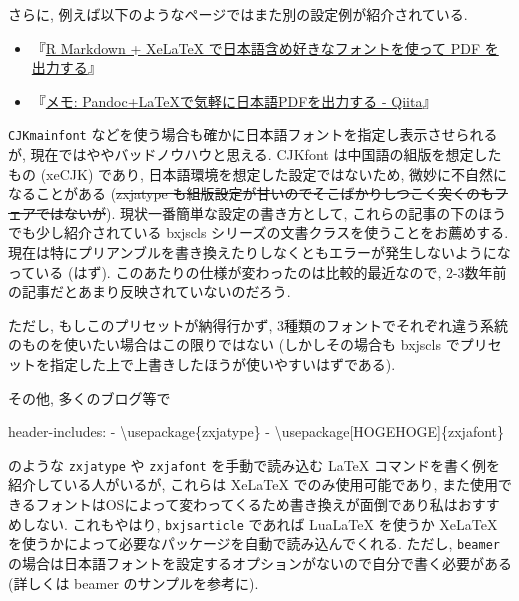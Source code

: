 \documentclass[
  letterpaper,
  DIV=11,
  pandoc,
  ja=standard,
  jafont=noto-otf]{bxjsarticle}
\newenvironment{Shaded}{\begin{snugshade}}{\end{snugshade}}
\newcommand{\AttributeTok}[1]{\textcolor[rgb]{0.00,0.48,0.65}{#1}}
\newcommand{\FunctionTok}[1]{\textcolor[rgb]{0.28,0.35,0.67}{#1}}
\newcommand{\KeywordTok}[1]{\textcolor[rgb]{0.00,0.48,0.65}{#1}}
\providecommand{\tightlist}{%
  \setlength{\itemsep}{0pt}\setlength{\parskip}{0pt}}
\begin{document}
さらに, 例えば以下のようなページではまた別の設定例が紹介されている.

\begin{itemize}
\tightlist
\item
  『\href{https://blog.atusy.net/2019/05/14/rmd2pdf-any-font/}{R
  Markdown + XeLaTeX で日本語含め好きなフォントを使って PDF
  を出力する}』
\item
  『\href{https://qiita.com/sky_y/items/15bf7737f4b37da50372\#\%E6\%96\%B9\%E6\%B3\%952-3-bxjscls\%E3\%81\%A7-cjkmainfont\%E5\%A4\%89\%E6\%95\%B0\%E3\%82\%92\%E4\%BD\%BF\%E3\%81\%86\%E6\%96\%B9\%E6\%B3\%95}{メモ:
  Pandoc+LaTeXで気軽に日本語PDFを出力する - Qiita}』
\end{itemize}

\texttt{CJKmainfont}
などを使う場合も確かに日本語フォントを指定し表示させられるが,
現在ではややバッドノウハウと思える. CJKfont は中国語の組版を想定したもの
(xeCJK) であり, 日本語環境を想定した設定ではないため,
微妙に不自然になることがある (\sout{zxjatype
も組版設定が甘いのでそこばかりしつこく突くのもフェアではないが}).
現状一番簡単な設定の書き方として,
これらの記事の下のほうでも少し紹介されている bxjscls
シリーズの文書クラスを使うことをお薦めする.
現在は特にプリアンブルを書き換えたりしなくともエラーが発生しないようになっている
(はず). このあたりの仕様が変わったのは比較的最近なので,
2-3数年前の記事だとあまり反映されていないのだろう.

ただし, もしこのプリセットが納得行かず,
3種類のフォントでそれぞれ違う系統のものを使いたい場合はこの限りではない
(しかしその場合も bxjscls
でプリセットを指定した上で上書きしたほうが使いやすいはずである).

その他, 多くのブログ等で

\begin{Shaded}
\begin{Highlighting}[]
\FunctionTok{header{-}includes}\KeywordTok{:}\AttributeTok{ }
\AttributeTok{  }\KeywordTok{{-}}\AttributeTok{ \textbackslash{}usepackage\{zxjatype\} }
\AttributeTok{  }\KeywordTok{{-}}\AttributeTok{ \textbackslash{}usepackage[HOGEHOGE]\{zxjafont\}}
\end{Highlighting}
\end{Shaded}

のような \texttt{zxjatype} や \texttt{zxjafont} を手動で読み込む LaTeX
コマンドを書く例を紹介している人がいるが, これらは XeLaTeX
でのみ使用可能であり,
また使用できるフォントはOSによって変わってくるため書き換えが面倒であり私はおすすめしない.
これもやはり, \texttt{bxjsarticle} であれば LuaLaTeX を使うか XeLaTeX
を使うかによって必要なパッケージを自動で読み込んでくれる. ただし,
\texttt{beamer}
の場合は日本語フォントを設定するオプションがないので自分で書く必要がある
(詳しくは beamer のサンプルを参考に).
\end{document}
